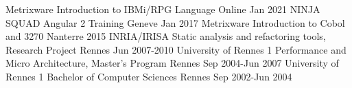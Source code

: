 
\begin{cventries}

\cventry
{Metrixware} %
{Introduction to IBMi/RPG Language} %
{Online} %
{Jan 2021} %
{
}
\cventry
{NINJA SQUAD} %
{Angular 2 Training} %
{Geneve} %
{Jan 2017} %
{
}
\cventry
{Metrixware} %
{Introduction to Cobol and 3270} %
{Nanterre} %
{2015} %
{
}
\cventry
{INRIA/IRISA} %
{Static analysis and refactoring tools, Research Project} %
{Rennes} %
{Jun 2007-2010} %
{
}
\cventry
{University of Rennes 1} %
{Performance and Micro Architecture, Master's Program} %
{Rennes} %
{Sep 2004-Jun 2007} %
{
}
\cventry
{University of Rennes 1} %
{Bachelor of Computer Sciences} %
{Rennes} %
{Sep 2002-Jun 2004} %
{
}
\end{cventries}